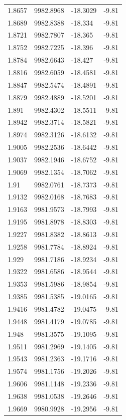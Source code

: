 \begin{table}[H]
\begin{tabular}{llll}
1.8657 & 9982.8968 & -18.3029 & -9.81 \\
1.8689 & 9982.8388 & -18.334 & -9.81 \\
1.8721 & 9982.7807 & -18.365 & -9.81 \\
1.8752 & 9982.7225 & -18.396 & -9.81 \\
1.8784 & 9982.6643 & -18.427 & -9.81 \\
1.8816 & 9982.6059 & -18.4581 & -9.81 \\
1.8847 & 9982.5474 & -18.4891 & -9.81 \\
1.8879 & 9982.4889 & -18.5201 & -9.81 \\
1.891 & 9982.4302 & -18.5511 & -9.81 \\
1.8942 & 9982.3714 & -18.5821 & -9.81 \\
1.8974 & 9982.3126 & -18.6132 & -9.81 \\
1.9005 & 9982.2536 & -18.6442 & -9.81 \\
1.9037 & 9982.1946 & -18.6752 & -9.81 \\
1.9069 & 9982.1354 & -18.7062 & -9.81 \\
1.91 & 9982.0761 & -18.7373 & -9.81 \\
1.9132 & 9982.0168 & -18.7683 & -9.81 \\
1.9163 & 9981.9573 & -18.7993 & -9.81 \\
1.9195 & 9981.8978 & -18.8303 & -9.81 \\
1.9227 & 9981.8382 & -18.8613 & -9.81 \\
1.9258 & 9981.7784 & -18.8924 & -9.81 \\
1.929 & 9981.7186 & -18.9234 & -9.81 \\
1.9322 & 9981.6586 & -18.9544 & -9.81 \\
1.9353 & 9981.5986 & -18.9854 & -9.81 \\
1.9385 & 9981.5385 & -19.0165 & -9.81 \\
1.9416 & 9981.4782 & -19.0475 & -9.81 \\
1.9448 & 9981.4179 & -19.0785 & -9.81 \\
1.948 & 9981.3575 & -19.1095 & -9.81 \\
1.9511 & 9981.2969 & -19.1405 & -9.81 \\
1.9543 & 9981.2363 & -19.1716 & -9.81 \\
1.9574 & 9981.1756 & -19.2026 & -9.81 \\
1.9606 & 9981.1148 & -19.2336 & -9.81 \\
1.9638 & 9981.0538 & -19.2646 & -9.81 \\
1.9669 & 9980.9928 & -19.2956 & -9.81 \\

\end{tabular}
\end{table}
